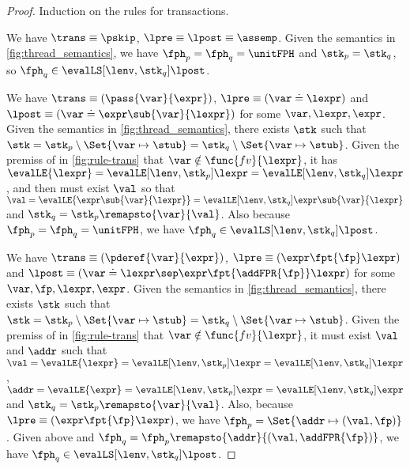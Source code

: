 \begin{proof}
Induction on the rules for transactions.


We have  \(\trans \equiv \pskip\), \( \lpre \equiv \lpost \equiv \assemp \).
Given the semantics in \fig \ref{fig:thread_semantics}, we have \( \fph_{p} = \fph_{q} = \unitFPH \) and \( \stk_{p} = \stk_{q} \), so \( \fph_{q} \in \evalLS[\lenv, \stk_{q}]{\lpost} \).


We have \(\trans \equiv ( \pass{\var}{\expr} ) \), \( \lpre \equiv ( \var \doteq \lexpr ) \) and \( \lpost \equiv ( \var \doteq \expr\sub{\var}{\lexpr} ) \) for some \( \var, \lexpr, \expr \).
Given the semantics in \fig \ref{fig:thread_semantics}, there exists \( \stk \) such that \( \stk = \stk_{p} \setminus \Set{\var \mapsto \stub} = \stk_{q} \setminus \Set{\var \mapsto \stub} \).
Given the premiss of   in \fig \ref{fig:rule-trans} that \( \var \notin \func{fv}{\lexpr} \), it has \( \evalLE{\lexpr} = \evalLE[\lenv, \stk_{p}]{\lexpr} = \evalLE[\lenv, \stk_{q}]{\lexpr} \), and then must exist \( \val \) so that \( \val = \evalLE{\expr\sub{\var}{\lexpr}} = \evalLE[\lenv, \stk_{q}]{\expr\sub{\var}{\lexpr}} \) and \( \stk_{q} = \stk_{p}\remapsto{\var}{\val} \).
Also because \( \fph_{p} = \fph_{q} = \unitFPH \), we have \( \fph_{q} \in \evalLS[\lenv, \stk_{q}]{\lpost} \).


We have  \(\trans \equiv ( \pderef{\var}{\expr} ) \), \( \lpre \equiv ( \expr \fpt{\fp} \lexpr ) \) and \( \lpost \equiv ( \var \doteq \lexpr \sep \expr \fpt{\addFPR{\fp}} \lexpr ) \) for some \( \var, \fp, \lexpr, \expr \).
Given the semantics in \fig \ref{fig:thread_semantics}, there exists \( \stk \) such that \( \stk = \stk_{p} \setminus \Set{\var \mapsto \stub} = \stk_{q} \setminus \Set{\var \mapsto \stub} \).
Given the premiss of  in \fig \ref{fig:rule-trans} that \( \var \notin \func{fv}{\lexpr} \), it must exist \( \val \) and \( \addr \) such that \( \val = \evalLE{\lexpr} = \evalLE[\lenv, \stk_{p}]{\lexpr} = \evalLE[\lenv, \stk_{q}]{\lexpr} \), \( \addr = \evalLE{\expr} = \evalLE[\lenv, \stk_{p}]{\expr} = \evalLE[\lenv, \stk_{q}]{\expr} \) and \(  \stk_{q} = \stk_{p}\remapsto{\var}{\val} \).
Also, because \( \lpre \equiv ( \expr \fpt{\fp} \lexpr ) \), we have \( \fph_{p} = \Set{\addr \mapsto (\val, \fp) }\).
Given above and \( \fph_{q} = \fph_{p}\remapsto{\addr}{ ( \val, \addFPR{\fp} ) } \), we have \( \fph_{q} \in \evalLS[\lenv, \stk_{q}]{\lpost} \).


\end{proof}

